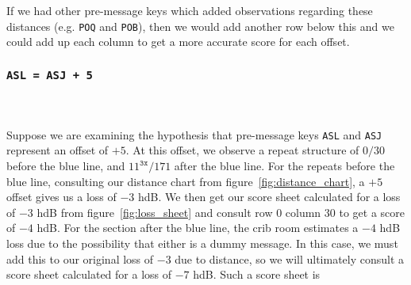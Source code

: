 \noindent If we had other pre-message keys which added observations
regarding these distances (e.g. \texttt{POQ} and \texttt{POB}),
then we would add another row below this and we could add up each
column to get a more accurate score for each offset.

\subsubsection{\texttt{ASL = ASJ + 5}}
\text{}\\\\Suppose we are examining the hypothesis that pre-message
keys \texttt{ASL} and \texttt{ASJ} represent an offset of $+5$. At
this offset, we observe a repeat structure of $0/30$ before the
blue line, and $11^\texttt{3x}/171$ after the blue line. For the
repeats before the blue line, consulting our distance chart from
figure~\ref{fig:distance_chart}, a $+5$ offset gives us a loss of
$-3$ hdB. We then get our score sheet calculated for a loss of $-3$
hdB from figure~\ref{fig:loss_sheet} and consult row $0$ column
$30$ to get a score of $-4$ hdB. For the section after the blue
line, the crib room estimates a $-4$ hdB loss due to the
possibility that either is a dummy message. In this case, we must
add this to our original loss of $-3$ due to distance, so we will
ultimately consult a score sheet calculated for a loss of $-7$ hdB.
Such a score sheet is
